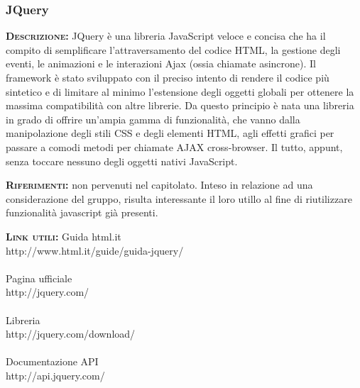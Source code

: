 \subsubsection{JQuery}
\begin{description}
	\item{\scshape\bfseries Descrizione:} JQuery è una libreria JavaScript veloce e concisa che ha il compito di semplificare l'attraversamento del codice HTML, la gestione degli eventi, le animazioni e le interazioni Ajax (ossia chiamate asincrone). Il framework è stato sviluppato con il preciso intento di rendere il codice più sintetico e di limitare al minimo l’estensione degli oggetti globali per ottenere la massima compatibilità con altre librerie. Da questo principio è nata una libreria in grado di offrire un'ampia gamma di funzionalità, che vanno dalla manipolazione degli stili CSS e degli elementi HTML, agli effetti grafici per passare a comodi metodi per chiamate AJAX cross-browser. Il tutto, appunt, senza toccare nessuno degli oggetti nativi JavaScript.
	\item{\scshape\bfseries Riferimenti:} non pervenuti nel capitolato. Inteso in relazione ad una considerazione del gruppo, risulta interessante il loro utillo al fine di riutilizzare funzionalità javascript già presenti.
	\item{\scshape\bfseries Link utili:}
	Guida html.it\\http://www.html.it/guide/guida-jquery/\\\\
	Pagina ufficiale\\http://jquery.com/\\\\
	Libreria\\http://jquery.com/download/\\\\
	Documentazione API\\http://api.jquery.com/
\end{description}

